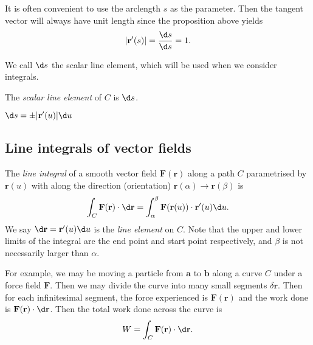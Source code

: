\documentclass[a4paper]{article}
\begin{document}
It is often convenient to use the arclength $s$ as the parameter. Then the tangent vector will always have unit length since the proposition above yields
\[
  |\mathbf{r}'(s)| = \frac{\d s}{\d s} = 1.
\]

We call $\d s$ the scalar line element, which will be used when we consider integrals.
\begin{defi}
  The \emph{scalar line element} of $C$ is $\d s$.
\end{defi}

\begin{prop}
  $\d s = \pm |\mathbf{r}'(u)| \d u$
\end{prop}
\subsection{Line integrals of vector fields}
\begin{defi}
  The \emph{line integral} of a smooth vector field $\mathbf{F}(\mathbf{r})$ along a path $C$ parametrised by $\mathbf{r}(u)$ with along the direction (orientation) $ \mathbf{r}(\alpha)\to \mathbf{r}(\beta)$ is
  \[
    \int_C \mathbf{F}(\mathbf{r})\cdot \d \mathbf{r} = \int_\alpha^\beta \mathbf{F}(\mathbf{r}(u))\cdot \mathbf{r}'(u)\d u.
  \]
  We say $\d \mathbf{r} = \mathbf{r}'(u) \d u$ is the \emph{line element} on $C$. Note that the upper and lower limits of the integral are the end point and start point respectively, and $\beta$ is not necessarily larger than $\alpha$. 
\end{defi}
For example, we may be moving a particle from $\mathbf{a}$ to $\mathbf{b}$ along a curve $C$ under a force field $\mathbf{F}$. Then we may divide the curve into many small segments $\delta \mathbf{r}$. Then for each infinitesimal segment, the force experienced is $\mathbf{F}(\mathbf{r})$ and the work done is $\mathbf{F}(\mathbf{r})\cdot \d\mathbf{r}$. Then the total work done across the curve is
\[
  W = \int_C \mathbf{F}(\mathbf{r})\cdot \d \mathbf{r}.
\]
\end{document}
